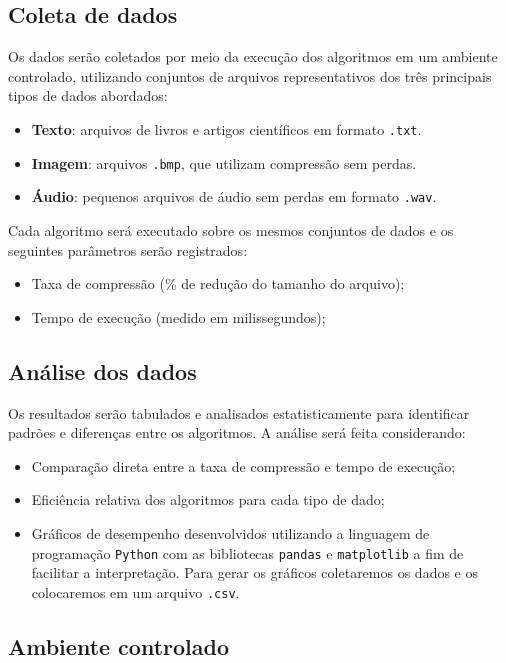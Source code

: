\subsection{Coleta de dados}
Os dados serão coletados por meio da execução dos algoritmos em um ambiente controlado, utilizando conjuntos de arquivos representativos dos três principais tipos de dados abordados: 

\begin{itemize}
    \item \textbf{Texto}: arquivos de livros e artigos científicos em formato \texttt{.txt}.
    \item \textbf{Imagem}: arquivos \texttt{.bmp}, que utilizam compressão sem perdas.
    \item \textbf{Áudio}: pequenos arquivos de áudio sem perdas em formato \texttt{.wav}.
\end{itemize}

Cada algoritmo será executado sobre os mesmos conjuntos de dados e os seguintes parâmetros serão registrados:

\begin{itemize}
    \item Taxa de compressão (\% de redução do tamanho do arquivo);
    \item Tempo de execução (medido em milissegundos);
\end{itemize}

\subsection{Análise dos dados}

Os resultados serão tabulados e analisados estatisticamente para identificar padrões e diferenças entre os algoritmos. A análise será feita considerando:

\begin{itemize}
    \item Comparação direta entre a taxa de compressão e tempo de execução;
    \item Eficiência relativa dos algoritmos para cada tipo de dado;
    \item Gráficos de desempenho desenvolvidos utilizando a linguagem de programação \texttt{Python} com as bibliotecas \texttt{pandas} e \texttt{matplotlib} a fim de facilitar a interpretação. Para gerar os gráficos coletaremos os dados e os colocaremos em um arquivo \texttt{.csv}. 
\end{itemize}

\subsection*{Ambiente controlado}

